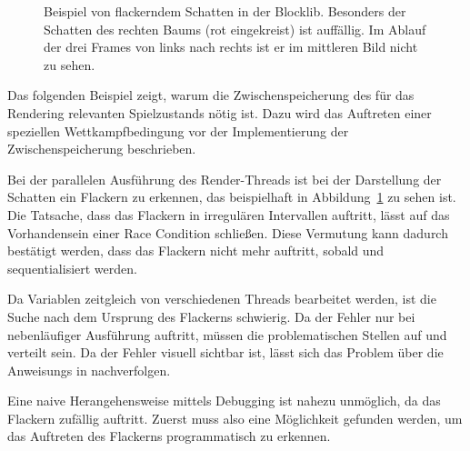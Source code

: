\begin{figure}
	\hfill
	\hfill
	\caption[Beispiel von flackerndem Schatten in der Blocklib.]{Beispiel von flackerndem Schatten in der Blocklib. Besonders der Schatten des rechten Baums (rot eingekreist) ist auffällig. Im Ablauf der drei Frames von links nach rechts ist er im mittleren Bild nicht zu sehen.}\label{fig:flackern}
\end{figure}
Das folgenden Beispiel zeigt, warum die Zwischenspeicherung des für das Rendering relevanten Spielzustands nötig ist. Dazu wird das Auftreten einer speziellen Wettkampfbedingung vor der Implementierung der Zwischenspeicherung beschrieben. 

Bei der parallelen Ausführung des Render-Threads ist bei der Darstellung der Schatten ein Flackern zu erkennen, das beispielhaft in Abbildung~\ref{fig:flackern} zu sehen ist. Die Tatsache, dass das Flackern in irregulären Intervallen auftritt, lässt auf das Vorhandensein einer Race Condition schließen. Diese Vermutung kann dadurch bestätigt werden, dass das Flackern nicht mehr auftritt, sobald  und  sequentialisiert werden.

Da Variablen zeitgleich von verschiedenen Threads bearbeitet werden, ist die Suche nach dem Ursprung des Flackerns schwierig. Da der Fehler nur bei nebenläufiger Ausführung auftritt, müssen die problematischen Stellen auf  und  verteilt sein. Da der Fehler visuell sichtbar ist, lässt sich das Problem über die \glspl{Anweisung} in  nachverfolgen. 

Eine naive Herangehensweise mittels Debugging ist nahezu unmöglich, da das Flackern zufällig auftritt. Zuerst muss also eine Möglichkeit gefunden werden, um das Auftreten des Flackerns programmatisch zu erkennen.

